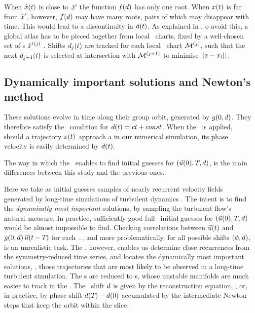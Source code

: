 When ${\hat{x}}(t)$ is close to ${{\hat{x}'}}$ the function $f(d)$
has only one root.
When ${x}(t)$ is far from ${{\hat{x}'}}$, however, $f(d)$
may have many roots, pairs of which may disappear with time.
This would lead
to a discontinuity in $d(t)$.  As explained in
, o avoid this, a global
atlas has to be pieced together from local \slice\ charts, fixed by
a well-chosen set of
\template s ${\hat{x}'}{}^{(j)}$ .
Shifts $d_j(t)$ are tracked for each local \slice\ chart ${\cal M}{}^{(j)}$,
such that the next $d_{j+1}(t)$ is selected at intersection with
${\cal M}{}^{(j+1)}$
to minimise $\|{{x}-{x_i}}\|$.


\subsection{Dynamically important solutions and Newton's method}
\label{s:reqva}

These solutions evolve in time along their
group orbit, generated by $g(0,d)$. They therefore satisfy the
\slice\ condition  for $d(t)=ct +const$.
When the \mslices\ is applied, should a trajectory
$x(t)$ approach a {\reqv} in our numerical simulation,
its phase velocity is easily determined by $d(t)$.

The way in which the \mslices\ enables to find initial
guesses for $(\vec{u}(0),{T_{}},d)$, is the main differences
between this study and the previous ones.

Here we take as initial guesses samples of nearly recurrent velocity
fields generated by long-time simulations of turbulent dynamics
. The intent is to find the {\em dynamically most
important} solutions, by sampling the turbulent flow's natural measure.
In practice, sufficiently good full \statesp\ initial guesses for
$(\vec{u}(0),{T_{}},d)$ would be almost impossible to find.
Checking correlations between $\vec{u}(t)$ and
$g(0,d)\,\vec{u}(t-{T_{}})$ for each $\period{}$, and
more problematically, for all possible shifts $(\phi,d)$, is an
unrealistic task. The \mslices, however, enables us determine close
recurrences  from the symmetry-reduced time series, and locates the
dynamically most important solutions, \ie, those trajectories that are
most likely to be observed in a long-time turbulent simulation. The \rpo
s are reduced to \po s, whose unstable manifolds are much easier to track
in the \reducedsp. The \rpo\ shift $d$ is given by the
reconstruction equation, , or, in practice, by phase
shift $d({T_{}})-d(0)$ accumulated by the intermediate
Newton steps that keep the orbit within the slice.


